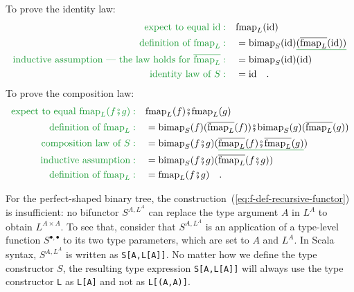 To prove the identity law:
\begin{align*}
{\color{greenunder}\text{expect to equal }\text{id}:}\quad & \text{fmap}_{L}(\text{id})\\
{\color{greenunder}\text{definition of }\text{fmap}_{L}:}\quad & =\text{bimap}_{S}(\text{id})\gunderline{(\overline{\text{fmap}_{L}}(\text{id}))}\\
{\color{greenunder}\text{inductive assumption --- the law holds for }\overline{\text{fmap}_{L}}:}\quad & =\text{bimap}_{S}(\text{id})(\text{id})\\
{\color{greenunder}\text{identity law of }S:}\quad & =\text{id}\quad.
\end{align*}
To prove the composition law:
\begin{align*}
{\color{greenunder}\text{expect to equal }\text{fmap}_{L}(f\bef g):}\quad & \text{fmap}_{L}(f)\bef\text{fmap}_{L}(g)\\
{\color{greenunder}\text{definition of }\text{fmap}_{L}:}\quad & =\text{bimap}_{S}(f)(\overline{\text{fmap}_{L}}(f))\bef\text{bimap}_{S}(g)(\overline{\text{fmap}_{L}}(g))\\
{\color{greenunder}\text{composition law of }S:}\quad & =\text{bimap}_{S}(f\bef g)(\gunderline{\overline{\text{fmap}_{L}}(f)\bef\overline{\text{fmap}_{L}}(g)})\\
{\color{greenunder}\text{inductive assumption}:}\quad & =\text{bimap}_{S}(f\bef g)(\overline{\text{fmap}_{L}}(f\bef g))\\
{\color{greenunder}\text{definition of }\text{fmap}_{L}:}\quad & =\text{fmap}_{L}(f\bef g)\quad.
\end{align*}

For the perfect-shaped binary tree, the construction~(\ref{eq:f-def-recursive-functor})
is insufficient: no bifunctor $S^{A,L^{A}}$ can replace the type
argument $A$ in $L^{A}$ to obtain $L^{A\times A}$. To see that,
consider that $S^{A,L^{A}}$ is an application of a type-level function
$S^{\bullet,\bullet}$ to its two type parameters, which are set to
$A$ and $L^{A}$. In Scala syntax, $S^{A,L^{A}}$ is written as \lstinline!S[A,L[A]]!.
No matter how we define the type constructor $S$, the resulting type
expression \lstinline!S[A,L[A]]! will always use the type constructor
\lstinline!L! as \lstinline!L[A]! and not as \lstinline!L[(A,A)]!. 

